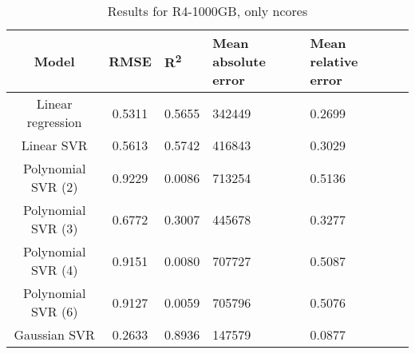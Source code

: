 \begin{table}[H]
\centering
\begin{adjustbox}{center}
\begin{tabular}{c | c M{1.2cm} M{2.5cm} M{2.5cm} M{1.8cm}}
Model & RMSE & R\textsuperscript{2} & Mean absolute error & Mean relative error \tabularnewline
\hline
Linear regression & 0.5311 & 0.5655 & 342449 & 0.2699 \\
Linear SVR & 0.5613 & 0.5742 & 416843 & 0.3029 \\
Polynomial SVR (2) & 0.9229 & 0.0086 & 713254 & 0.5136 \\
Polynomial SVR (3) & 0.6772 & 0.3007 & 445678 & 0.3277 \\
Polynomial SVR (4) & 0.9151 & 0.0080 & 707727 & 0.5087 \\
Polynomial SVR (6) & 0.9127 & 0.0059 & 705796 & 0.5076 \\
Gaussian SVR & 0.2633 & 0.8936 & 147579 & 0.0877 \\
\end{tabular}
\end{adjustbox}
\\
\caption{Results for R4-1000GB, only ncores}
\label{tab:only_1_linear_R4_1000}
\end{table}
